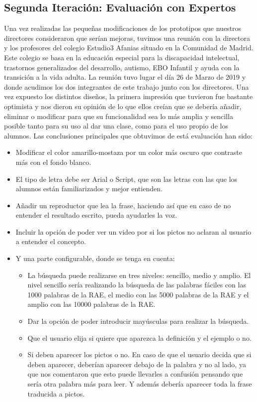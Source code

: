 \subsection{Segunda Iteración: Evaluación con Expertos}
\label{cap:subsec:evaluacionExpertos}

Una vez realizadas las pequeñas modificaciones de los prototipos que nuestros directores consideraron que serían mejoras, tuvimos una reunión con la directora y los profesores del colegio Estudio3 Afanias situado en la Comunidad de Madrid. Este colegio se basa en la educación especial para la discapacidad intelectual, trastornos generalizados del desarrollo, autismo, EBO Infantil y ayuda con la transición a la vida adulta.
La reunión tuvo lugar el día 26 de Marzo de 2019 y donde acudimos los dos integrantes de este trabajo junto con los directores.
Una vez expuesto los distintos diseños, la primera impresión que tuvieron fue bastante optimista y nos dieron su opinión de lo que ellos creían que se debería añadir, eliminar o modificar para que su funcionalidad sea lo más amplia y sencilla posible tanto para su uso al dar una clase, como para el uso propio de los alumnos. 
Las conclusiones principales que obtuvimos de está evaluación han sido:
\begin{itemize} 
	\item Modificar el color amarillo-mostaza por un color más oscuro que contraste más con el fondo blanco.
	\item El tipo de letra debe ser Arial o Script, que son las letras con las que los alumnos están familiarizados y mejor entienden.
	\item Añadir un reproductor que lea la frase, haciendo así que en caso de no entender el resultado escrito, pueda ayudarles la voz.
	\item Incluir la opción de poder ver un video por si los pictos no aclaran al usuario a entender el concepto.
	\item Y una parte configurable, donde se tenga en cuenta:
	\begin{itemize}
		\item La búsqueda puede realizarse en tres niveles: sencillo, medio y amplio. El nivel sencillo sería realizando la búsqueda de las palabras fáciles con las 1000 palabras de la RAE, el medio con las 5000 palabras de la RAE y el amplio con las 10000 palabras de la RAE. 
		\item Dar la opción de poder introducir mayúsculas para realizar la búsqueda.
		\item Que el usuario elija si quiere que aparezca la definición y el ejemplo o no.
		\item Si deben aparecer los pictos o no. En caso de que el usuario decida que si deben aparecer, deberían aparecer debajo de la palabra y no al lado, ya que nos comentaron que esto puede llevarles a confusión pensando que sería otra palabra más para leer. Y además debería aparecer toda la frase traducida a pictos.
	\end{itemize}
\end{itemize}
